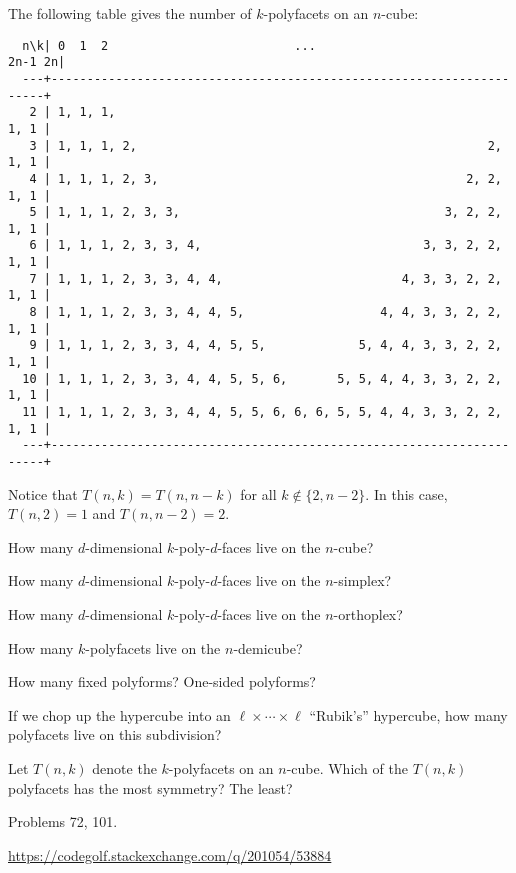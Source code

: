 \documentclass{article}
\begin{document}
\begin{note}
  The following table gives the number of $k$-polyfacets on an $n$-cube:
  \begin{verbatim}
  n\k| 0  1  2                          ...                         2n-1 2n|
  ---+---------------------------------------------------------------------+
   2 | 1, 1, 1,                                                       1, 1 |
   3 | 1, 1, 1, 2,                                                 2, 1, 1 |
   4 | 1, 1, 1, 2, 3,                                           2, 2, 1, 1 |
   5 | 1, 1, 1, 2, 3, 3,                                     3, 2, 2, 1, 1 |
   6 | 1, 1, 1, 2, 3, 3, 4,                               3, 3, 2, 2, 1, 1 |
   7 | 1, 1, 1, 2, 3, 3, 4, 4,                         4, 3, 3, 2, 2, 1, 1 |
   8 | 1, 1, 1, 2, 3, 3, 4, 4, 5,                   4, 4, 3, 3, 2, 2, 1, 1 |
   9 | 1, 1, 1, 2, 3, 3, 4, 4, 5, 5,             5, 4, 4, 3, 3, 2, 2, 1, 1 |
  10 | 1, 1, 1, 2, 3, 3, 4, 4, 5, 5, 6,       5, 5, 4, 4, 3, 3, 2, 2, 1, 1 |
  11 | 1, 1, 1, 2, 3, 3, 4, 4, 5, 5, 6, 6, 6, 5, 5, 4, 4, 3, 3, 2, 2, 1, 1 |
  ---+---------------------------------------------------------------------+
  \end{verbatim}
  Notice that $T(n,k) = T(n,n-k)$ for all $k \not\in \{2, n-2\}$. In this case,
  $T(n,2) = 1$ and $T(n,n-2) = 2$.
\end{note}

\begin{related}
  \item How many $d$-dimensional $k$-poly-$d$-faces live on the $n$-cube?
  \item How many $d$-dimensional $k$-poly-$d$-faces live on the $n$-simplex?
  \item How many $d$-dimensional $k$-poly-$d$-faces live on the $n$-orthoplex?
  \item How many $k$-polyfacets live on the $n$-demicube?
  \item How many fixed polyforms? One-sided polyforms?
  \item If we chop up the hypercube into an $\ell \times \cdots \times \ell$ ``Rubik's'' hypercube, how many polyfacets live on this subdivision?
  \item Let $T(n,k)$ denote the $k$-polyfacets on an $n$-cube.
    Which of the $T(n,k)$ polyfacets has the most symmetry? The least?
\end{related}
\begin{references}
  \item Problems 72, 101.
  \item \url{https://codegolf.stackexchange.com/q/201054/53884}
\end{references}
\end{document}

